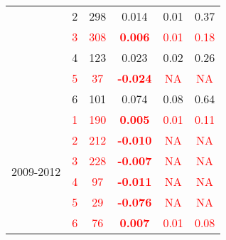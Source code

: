 \begin{table}
\begin{tabular}{rrrrrr}
    \multicolumn{1}{c}{} & \multicolumn{1}{c}{2} & \multicolumn{1}{c}{298} & \multicolumn{1}{c}{0.014 } & \multicolumn{1}{c}{0.01 } & \multicolumn{1}{c}{0.37 } \\
    \multicolumn{1}{c}{} & \multicolumn{1}{c}{\textcolor{red}{3}} & \multicolumn{1}{c}{\textcolor{red}{308}} & \multicolumn{1}{c}{\textcolor{red}{\textbf{0.006}}} & \multicolumn{1}{c}{\textcolor{red}{0.01}} & \multicolumn{1}{c}{\textcolor{red}{0.18}} \\
    \multicolumn{1}{c}{} & \multicolumn{1}{c}{4} & \multicolumn{1}{c}{123} & \multicolumn{1}{c}{0.023 } & \multicolumn{1}{c}{0.02 } & \multicolumn{1}{c}{0.26 } \\
    \multicolumn{1}{c}{} & \multicolumn{1}{c}{\textcolor{red}{5}} & \multicolumn{1}{c}{\textcolor{red}{37}} & \multicolumn{1}{c}{\textcolor{red}{\textbf{-0.024}}} & \multicolumn{1}{c}{\textcolor{red}{NA}} & \multicolumn{1}{c}{\textcolor{red}{NA}} \\
    \multicolumn{1}{c}{} & \multicolumn{1}{c}{6} & \multicolumn{1}{c}{101} & \multicolumn{1}{c}{0.074 } & \multicolumn{1}{c}{0.08 } & \multicolumn{1}{c}{0.64 } \\\midrule
    \multicolumn{1}{c}{\multirow{6}[2]{*}{\begin{sideways}2009-2012\end{sideways}}} & \multicolumn{1}{c}{\textcolor{red}{1}} & \multicolumn{1}{c}{\textcolor{red}{190}} & \multicolumn{1}{c}{\textcolor{red}{\textbf{0.005}}} & \multicolumn{1}{c}{\textcolor{red}{0.01}} & \multicolumn{1}{c}{\textcolor{red}{0.11}} \\
    \multicolumn{1}{c}{} & \multicolumn{1}{c}{\textcolor{red}{2}} & \multicolumn{1}{c}{\textcolor{red}{212}} & \multicolumn{1}{c}{\textcolor{red}{\textbf{-0.010}}} & \multicolumn{1}{c}{\textcolor{red}{NA}} & \multicolumn{1}{c}{\textcolor{red}{NA}} \\
    \multicolumn{1}{c}{} & \multicolumn{1}{c}{\textcolor{red}{3}} & \multicolumn{1}{c}{\textcolor{red}{228}} & \multicolumn{1}{c}{\textcolor{red}{\textbf{-0.007}}} & \multicolumn{1}{c}{\textcolor{red}{NA}} & \multicolumn{1}{c}{\textcolor{red}{NA}} \\
    \multicolumn{1}{c}{} & \multicolumn{1}{c}{\textcolor{red}{4}} & \multicolumn{1}{c}{\textcolor{red}{97}} & \multicolumn{1}{c}{\textcolor{red}{\textbf{-0.011}}} & \multicolumn{1}{c}{\textcolor{red}{NA}} & \multicolumn{1}{c}{\textcolor{red}{NA}} \\
    \multicolumn{1}{c}{} & \multicolumn{1}{c}{\textcolor{red}{5}} & \multicolumn{1}{c}{\textcolor{red}{29}} & \multicolumn{1}{c}{\textcolor{red}{\textbf{-0.076}}} & \multicolumn{1}{c}{\textcolor{red}{NA}} & \multicolumn{1}{c}{\textcolor{red}{NA}} \\
    \multicolumn{1}{c}{} & \multicolumn{1}{c}{\textcolor{red}{6}} & \multicolumn{1}{c}{\textcolor{red}{76}} & \multicolumn{1}{c}{\textcolor{red}{\textbf{0.007}}} & \multicolumn{1}{c}{\textcolor{red}{0.01}} & \multicolumn{1}{c}{\textcolor{red}{0.08}} \\
    \bottomrule
    \end{tabular}%
  \label{tab:SO4TVPHPA}%
\end{table}%
